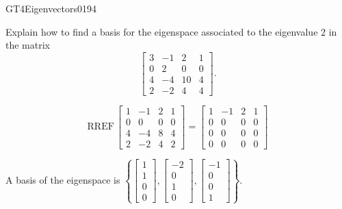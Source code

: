 \begin{exercise}{GT4}{Eigenvectors}{0194} 
\begin{exerciseStatement} 

Explain how to find a basis for the eigenspace associated to the eigenvalue \(2\) in the matrix \[\left[\begin{array}{cccc}
3 & -1 & 2 & 1 \\
0 & 2 & 0 & 0 \\
4 & -4 & 10 & 4 \\
2 & -2 & 4 & 4
\end{array}\right].\]

 \end{exerciseStatement}
 \begin{exerciseAnswer} 

\[\mathrm{RREF}\,\left[\begin{array}{cccc}
1 & -1 & 2 & 1 \\
0 & 0 & 0 & 0 \\
4 & -4 & 8 & 4 \\
2 & -2 & 4 & 2
\end{array}\right]=\left[\begin{array}{cccc}
1 & -1 & 2 & 1 \\
0 & 0 & 0 & 0 \\
0 & 0 & 0 & 0 \\
0 & 0 & 0 & 0
\end{array}\right]\]

 

A basis of the eigenspace is \(\left\{ \left[\begin{array}{c}
1 \\
1 \\
0 \\
0
\end{array}\right] , \left[\begin{array}{c}
-2 \\
0 \\
1 \\
0
\end{array}\right] , \left[\begin{array}{c}
-1 \\
0 \\
0 \\
1
\end{array}\right] \right\}\).

 \end{exerciseAnswer}
 \end{exercise}


\newpage




